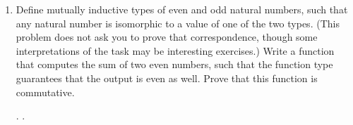 \documentclass[12pt]{report}
\begin{document}
\begin{enumerate}
\begin{coqdoccode}
\coqdocindent{3.00em}
      ( ).\coqdoceol
\coqdocindent{2.00em}
 ; .\coqdoceol
\coqdocindent{2.00em}
-  ;  , ; ; ; ;   *; .\coqdoceol
\coqdocindent{2.00em}
-  ;   ; ; ; ;  (  );\coqdoceol
\coqdocindent{4.00em}
 (  ); . .\coqdoceol
\coqdocnoindent
{} .\coqdoceol
\end{coqdoccode}
\item Define mutually inductive types of even and odd natural numbers, such that any natural number is isomorphic to a value of one of the two types.  (This problem does not ask you to prove that correspondence, though some interpretations of the task may be interesting exercises.)  Write a function that computes the sum of two even numbers, such that the function type guarantees that the output is even as well.  Prove that this function is commutative.
 \begin{coqdoccode}
\coqdocemptyline
\coqdocnoindent
{} .\coqdoceol
\coqdocemptyline
\coqdocnoindent
{} .\coqdoceol
\coqdocemptyline
\end{coqdoccode}
\end{enumerate} \begin{coqdoccode}
\end{coqdoccode}
\end{document}

